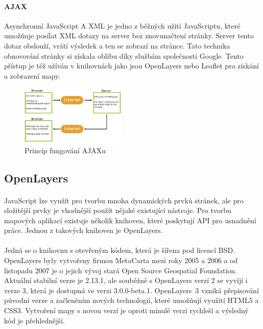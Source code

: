 \documentclass[11pt,a4paper,titlepage,oneside]{book}
\begin{document}
		\paragraph{AJAX} Asynchronní JavaScript A XML je jedno z běžných užití Java\-Scriptu, které umožňuje posílat XML dotazy na server bez znovunačtení stránky. Server tento dotaz obslouží, vrátí výsledek a ten se zobrazí na stránce. Tato technika obnovování stránky si získala oblibu díky službám společnosti Google. Tento přístup je též užíván v knihovnách jako jsou OpenLayers nebo Leaflet pro získání a zobrazení mapy.

		\begin{figure}[!h]
			\begin{center}
				\includegraphics[width=5cm]{obrazky/ajax.png}
				\caption{Princip fungování AJAXu}
				\label{fig:ajax}
			\end{center}
		\end{figure}	

		\subsection{OpenLayers} %
			\paragraph{} JavaScript lze využít pro tvorbu mnoha dynamických prvků stránek, ale pro složitější prvky je vhodnější použít nějaké existující nástroje. Pro tvorbu mapových aplikací existuje několik knihoven, které poskytují  API  pro usnadnění práce. Jednou z takových knihoven je OpenLayers.
			\paragraph{} Jedná se o knihovnu s otevřeným kódem, která je šířena pod licencí BSD. OpenLayers byly vytvořeny firmou MetaCarta mezi roky 2005 a 2006 a od listopadu 2007 je o jejich vývoj stará Open Source Geospatial Foundation. Aktuální stabilní verze je 2.13.1, ale souběžně s OpenLayers verzí 2 se vyvíjí i verze 3, která je dostupná ve verzi 3.0.0-beta.1. OpenLayers~3 vzniká přepisování původní verze a začleněním nových technologií, které umožňují využití HTML5 a CSS3. Vytvoření mapy s novou verzí je oproti minulé verzi rychleší a výsledný kód je přehlednější.
\end{document}
